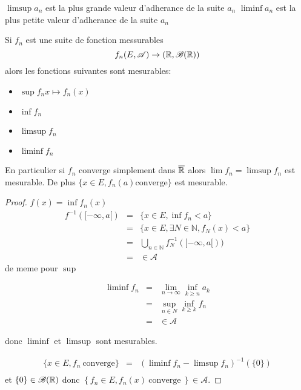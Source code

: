 \begin{remarque}
	$\limsup a_n$ est la plus grande valeur d'adherance de la suite $a_n$
	$\liminf a_n$ est la plus petite valeur d'adherance de la suite $a_n$
\end{remarque}

\begin{prop}
	Si $f_n$ est une suite de fonction messurables
	$$f_n (E,\mathscr{A}) \rightarrow (\mathbb{R},\mathscr{B}(\mathbb{R}))$$
	alors les fonctions suivantes sont mesurables:
	\begin{itemize}
		\item $\sup f_n x\mapsto f_n(x) $
		\item $\inf f_n$
		\item $\limsup f_n$
		\item $\liminf f_n$
	\end{itemize}
	En particulier si $f_n$ converge simplement dans $\overline{\mathbb{R}}$ alors
	$\lim f_n = \limsup f_n$ est mesurable. De plus $\{ x \in E, f_n(a) \text{converge}\}$ est mesurable.
\end{prop}

\begin{proof}
	$f(x) = \inf f_n (x)$
	\begin{eqnarray*}
		f^{-1}([-\infty, a[) &=& \{x \in E, \inf f_n < a\} \\
		&=& \{x \in E, \exists N \in \mathbb{N}, f_N (x) < a \}\\
		&=& \bigcup\limits_{n\in \mathbb{N}}f_N^{-1}([-\infty, a[))\\
		&=& \in \mathscr{A}
	\end{eqnarray*}
	de meme pour $\sup$

	\begin{eqnarray*}
		\liminf f_n &=& \lim\limits_{n \to \infty}\inf\limits_{k \geq n } a_k\\
		&=& \sup _{n\in N} \inf_{k \geq k} f_n\\
		&=& \in \mathscr{A}
	\end{eqnarray*}

	donc $\liminf$ et $\limsup$ sont mesurables.

	\begin{eqnarray*}
		\{x \in E, f_n \  \text{converge} \}  &=& (\liminf f_n - \limsup f_n)^{-1}(\{0\})\\
	\end{eqnarray*}
	et $\{ 0 \} \in \mathscr{B}(\mathbb{R})$ donc $\left\{ f_n \in E, f_n(x) \ \text{converge} \ \right\} \in \mathscr{A}$.
\end{proof}
